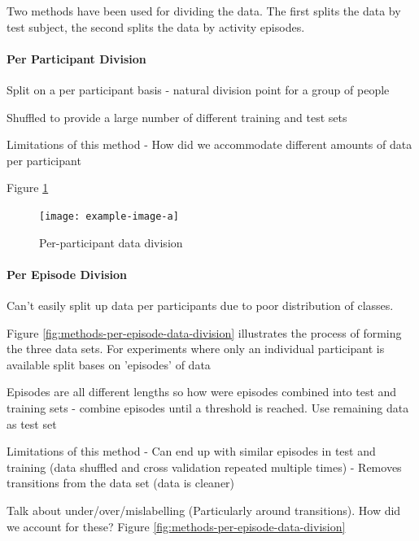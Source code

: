 Two methods have been used for dividing the data. The first splits the data by test subject, the second splits the data by activity episodes.

\paragraph{Per Participant Division}
\label{par:methods-per-participant-division}
Split on a per participant basis - natural division point for a group of people

Shuffled to provide a large number of different training and test sets

Limitations of this method
 - How did we accommodate different amounts of data per participant
 
Figure \ref{fig:methods-per-participant-division}
 
 \begin{figure}[!hbt]
     \centering
     \texttt{[image: example-image-a]}
     \caption{Per-participant data division}
     \label{fig:methods-per-participant-division}
 \end{figure}

\paragraph{Per Episode Division}
\label{par:methods-per-episode-division}
Can't easily split up data per participants due to poor distribution of classes. 

Figure \ref{fig:methods-per-episode-data-division} illustrates the process of forming the three data sets.
For experiments where only an individual participant is available split bases on 'episodes' of data

Episodes are all different lengths so how were episodes combined into test and training sets
    - combine episodes until a threshold is reached. Use remaining data as test set

Limitations of this method
 - Can end up with similar episodes in test and training (data shuffled and cross validation repeated multiple times)
 - Removes transitions from the data set (data is cleaner)
 
 Talk about under/over/mislabelling (Particularly around transitions). How did we account for these? Figure \ref{fig:methods-per-episode-data-division}
 
